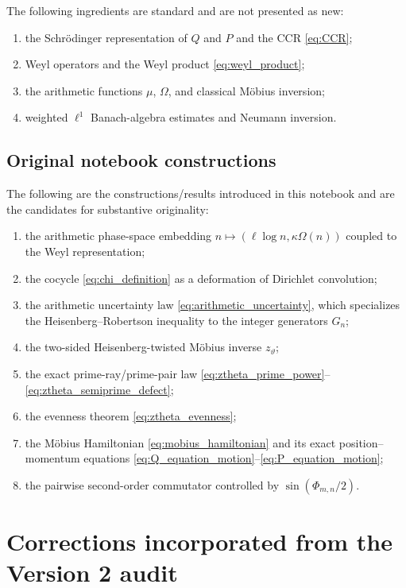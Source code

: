 \documentclass[11pt]{amsart}
\numberwithin{equation}{section}
\theoremstyle{plain}
\theoremstyle{definition}
\theoremstyle{remark}
\newcommand{\Om}{\Omega}
\begin{document}
The following ingredients are standard and are not presented as new:

\begin{enumerate}[leftmargin=*]
\item the Schr\"odinger representation of $Q$ and $P$ and the CCR
\eqref{eq:CCR};
\item Weyl operators and the Weyl product
\eqref{eq:weyl_product};
\item the arithmetic functions $\mu$, $\Om$, and classical M\"obius
inversion;
\item weighted $\ell^1$ Banach-algebra estimates and Neumann inversion.
\end{enumerate}

\subsection{Original notebook constructions}
\label{subsec:original_notebook_constructions}

The following are the constructions/results introduced in this notebook and
are the candidates for substantive originality:

\begin{enumerate}[leftmargin=*]
\item the arithmetic phase-space embedding
$n\mapsto(\ell\log n,\kappa\Om(n))$ coupled to the Weyl representation;
\item the cocycle \eqref{eq:chi_definition} as a deformation of Dirichlet
convolution;
\item the arithmetic uncertainty law \eqref{eq:arithmetic_uncertainty}, which specializes the Heisenberg--Robertson inequality to the integer generators \(G_n\);
\item the two-sided Heisenberg-twisted M\"obius inverse
$z_{\vartheta}$;
\item the exact prime-ray/prime-pair law
\eqref{eq:ztheta_prime_power}--\eqref{eq:ztheta_semiprime_defect};
\item the evenness theorem \eqref{eq:ztheta_evenness};
\item the M\"obius Hamiltonian \eqref{eq:mobius_hamiltonian} and its exact
position--momentum equations
\eqref{eq:Q_equation_motion}--\eqref{eq:P_equation_motion};
\item the pairwise second-order commutator controlled by
$\sin(\Phi_{m,n}/2)$.
\end{enumerate}


\section{Corrections incorporated from the Version 2 audit}
\label{sec:v2_audit_corrections}
\end{document}
